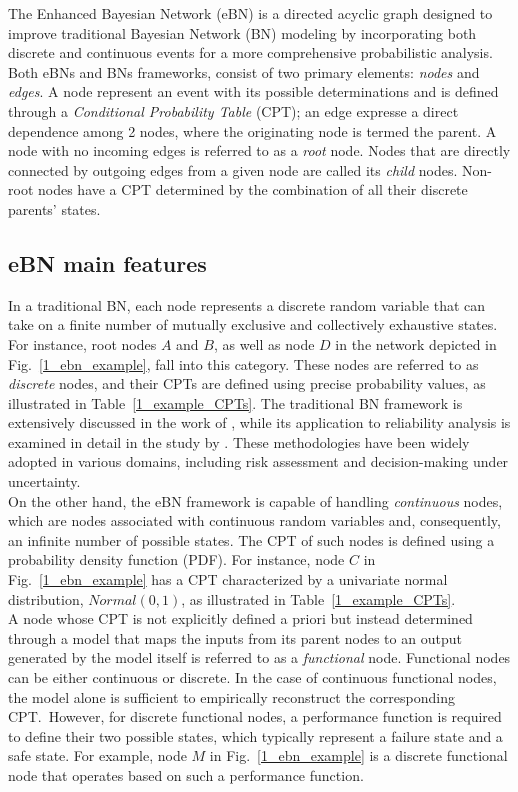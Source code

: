 
The Enhanced Bayesian Network (eBN) is a directed acyclic graph designed to improve traditional Bayesian Network (BN) modeling by incorporating both discrete and continuous events for a more comprehensive probabilistic analysis. \\
Both eBNs and BNs frameworks, consist of two primary elements: \textit{nodes} and \textit{edges}. A node represent an event with its possible determinations and is defined through a \textit{Conditional Probability Table} (CPT); an edge expresse a direct dependence among 2 nodes, where the originating node is termed the parent. A node with no incoming edges is referred to as a \textit{root} node. Nodes that are directly connected by outgoing edges from a given node are called its \textit{child} nodes. Non-root nodes have a CPT determined by the combination of all their discrete parents' states. \\

\subsection{eBN main features}
In a traditional BN, each node represents a discrete random variable that can take on a finite number of mutually exclusive and collectively exhaustive states. For instance, root nodes $A$ and $B$, as well as node $D$ in the network depicted in Fig.~\ref{1_ebn_example}, fall into this category. These nodes are referred to as \textit{discrete} nodes, and their CPTs are defined using precise probability values, as illustrated in Table~\ref{1_example_CPTs}. The traditional BN framework is extensively discussed in the work of \textcite{russell_computer}, while its application to reliability analysis is examined in detail in the study by \textcite{langseth_bayesian_2007}. These methodologies have been widely adopted in various domains, including risk assessment and decision-making under uncertainty. \\
On the other hand, the eBN framework is capable of handling \textit{continuous} nodes, which are nodes associated with continuous random variables and, consequently, an infinite number of possible states. The CPT of such nodes is defined using a probability density function (PDF). For instance, node $C$ in Fig.~\ref{1_ebn_example} has a CPT characterized by a univariate normal distribution, $Normal(0,1)$, as illustrated in Table~\ref{1_example_CPTs}. \\  
A node whose CPT is not explicitly defined a priori but instead determined through a model that maps the inputs from its parent nodes to an output generated by the model itself is referred to as a \textit{functional} node. Functional nodes can be either continuous or discrete. In the case of continuous functional nodes, the model alone is sufficient to empirically reconstruct the corresponding CPT.\ However, for discrete functional nodes, a performance function is required to define their two possible states, which typically represent a failure state and a safe state. For example, node $M$ in Fig.~\ref{1_ebn_example} is a discrete functional node that operates based on such a performance function. \\

